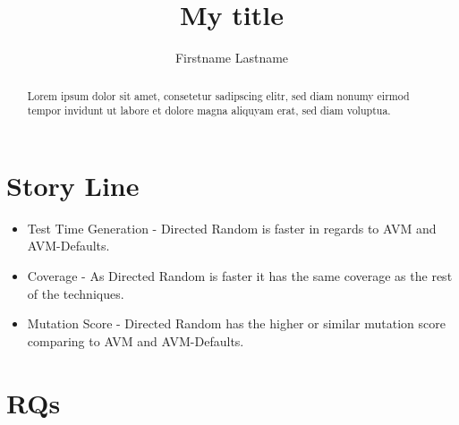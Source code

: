 \documentclass[runningheads,a4paper]{llncs}
\def\tightlist{} %
\begin{document}


\title{My title}
\author{Firstname Lastname}




%

\maketitle

	\begin{abstract}
		Lorem ipsum dolor sit amet, consetetur sadipscing elitr, sed diam nonumy
eirmod tempor invidunt ut labore et dolore magna aliquyam erat, sed diam
voluptua.
	\end{abstract}


\section{Story Line}\label{story-line}

\begin{itemize}
\tightlist
\item
  Test Time Generation - Directed Random is faster in regards to AVM and
  AVM-Defaults.
\item
  Coverage - As Directed Random is faster it has the same coverage as
  the rest of the techniques.
\item
  Mutation Score - Directed Random has the higher or similar mutation
  score comparing to AVM and AVM-Defaults.
\end{itemize}

\section{RQs}\label{rqs}
\end{document}
